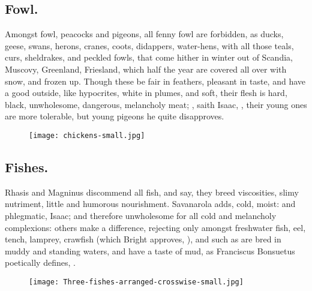 \subsection{Fowl.}
Amongst fowl, peacocks and pigeons, all fenny fowl are
forbidden, as ducks, geese, swans, herons, cranes, coots, didappers,
water-hens, with all those teals, curs, sheldrakes, and peckled fowls, that
come hither in winter out of Scandia, Muscovy, Greenland, Friesland, which half
the year are covered all over with snow, and frozen up. Though these be fair in
feathers, pleasant in taste, and have a good outside, like hypocrites, white in
plumes, and soft, their flesh is hard, black, unwholesome, dangerous,
melancholy meat; , saith Isaac,
, their young ones are more tolerable,
but young pigeons he quite disapproves.

\begin{figure}[H]
  \begingroup
  \centering
  \texttt{[image: chickens-small.jpg]}
  \label{fig:chickens}
\end{figure}

\subsection{Fishes.}\label{sec:fishes}
Rhasis and Magninus discommend all fish, and say, they
breed viscosities, slimy nutriment, little and humorous nourishment. Savanarola
adds, cold, moist: and phlegmatic, Isaac; and therefore unwholesome for all
cold and melancholy complexions: others make a difference, rejecting only
amongst freshwater fish, eel, tench, lamprey, crawfish (which Bright approves,
), and such as are bred in muddy and standing
waters, and have a taste of mud, as Franciscus Bonsuetus poetically defines,
.

\begin{figure}[H]
  \begingroup
  \centering
  \texttt{[image: Three-fishes-arranged-crosswise-small.jpg]}
  \label{fig:threefishes}
\end{figure}


